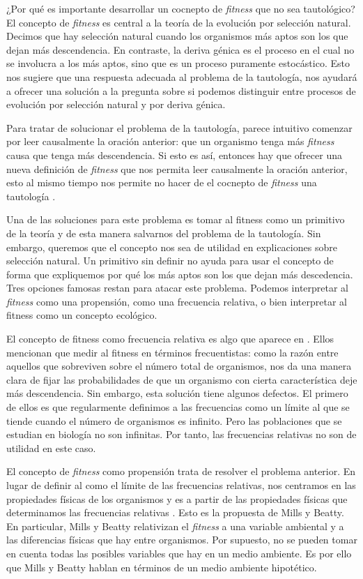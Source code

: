 ¿Por qué es importante desarrollar un cocnepto de \emph{fitness} que no sea tautológico? El concepto de \emph{fitness} es central a la teoría de la evolución por selección natural. Decimos que hay selección natural cuando los organismos más aptos son los que dejan más descendencia. En contraste, la deriva génica es el proceso en el cual no se involucra a los más aptos, sino que es un proceso puramente estocástico. Esto nos sugiere que una respuesta adecuada al problema de la tautología, nos ayudará a ofrecer una solución a la pregunta sobre si podemos distinguir entre procesos de evolución por selección natural y por deriva génica.

Para tratar de solucionar el problema de la tautología, parece intuitivo comenzar por leer causalmente la oración anterior: que un organismo tenga más \emph{fitness} causa que tenga más descendencia. Si esto es así, entonces hay que ofrecer una nueva definición de \emph{fitness} que nos permita leer causalmente la oración anterior, esto al mismo tiempo nos permite no hacer de el cocnepto de \emph{fitness} una tautología \cite{Bouchard2004}.

Una de las soluciones para este problema es tomar al fitness como un primitivo de la teoría y de esta manera salvarnos del problema de la tautología. Sin embargo, queremos que el concepto nos sea de utilidad en explicaciones sobre selección natural. Un primitivo sin definir no ayuda para usar el concepto de forma que expliquemos por qué los más aptos son los que dejan más descedencia. Tres opciones famosas restan para atacar este problema. Podemos interpretar al \emph{fitness} como una propensión, como una frecuencia relativa, o bien interpretar al fitness como un concepto ecológico.

El concepto de fitness como frecuencia relativa es algo que aparece en \cite{Walsh2002}. Ellos mencionan que medir al fitness en términos frecuentistas: como la razón entre aquellos que sobreviven sobre el número total de organismos, nos da una manera clara de fijar las probabilidades de que un organismo con cierta característica deje más descendencia. Sin embargo, esta solución  tiene algunos defectos. El primero de ellos es que regularmente definimos a las frecuencias como un límite al que se tiende cuando el número de organismos es infinito. Pero las poblaciones que se estudian en biología no son infinitas. Por tanto, las frecuencias relativas no son de utilidad en este caso.

El concepto de \emph{fitness} como propensión trata de resolver el problema anterior. En lugar de definir al  como el límite de las frecuencias relativas, nos centramos en las propiedades físicas de los organismos y es a partir de las propiedades físicas que determinamos las frecuencias relativas \cite{Mills1979}. Esto es la propuesta de Mills y Beatty. En particular, Mills y Beatty relativizan el \emph{fitness} a una variable ambiental y a las diferencias físicas que hay entre organismos. Por supuesto, no se pueden tomar en cuenta todas las posibles variables que hay en un medio ambiente. Es por ello que Mills y Beatty hablan en términos de un medio ambiente hipotético.

